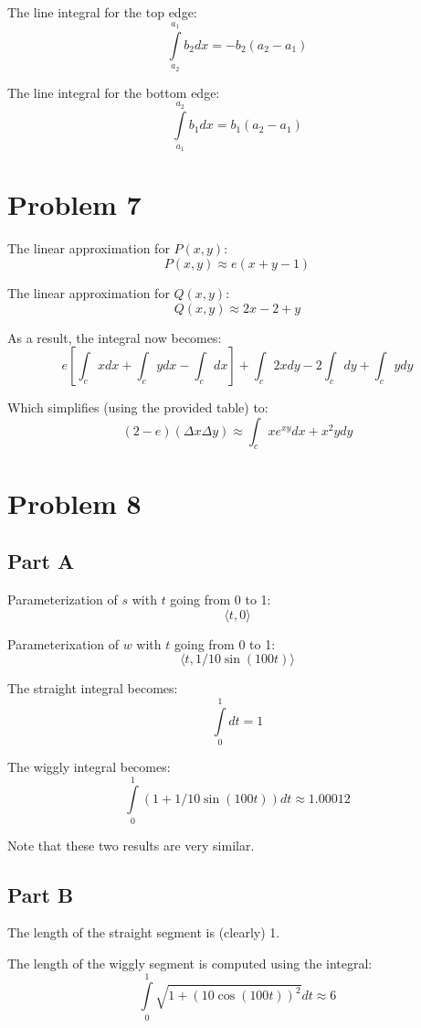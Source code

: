 \documentclass{article}
\begin{document}
The line integral for the top edge:
$$ \int\limits_{a_2}^{a_1} b_2 dx = -b_2(a_2 - a_1) $$

The line integral for the bottom edge:
$$ \int\limits_{a_1}^{a_2} b_1 dx = b_1(a_2 - a_1) $$

\section*{Problem 7}

The linear approximation for $P(x, y)$:
$$ P(x, y) \approx e(x + y - 1) $$

The linear approximation for $Q(x, y)$:
$$ Q(x, y) \approx 2x - 2 + y $$

As a result, the integral now becomes:
$$ e \left[ \int_c x dx + \int_c y dx - \int_c dx \right] + \int_c 2x dy - 2
\int_c dy + \int_c y dy $$

Which simplifies (using the provided table) to:
$$ (2 - e)(\Delta x \Delta y) \approx \int_c x e^{xy} dx + x^2 y dy $$

\section*{Problem 8}

\subsection*{Part A}

Parameterization of $s$ with $t$ going from 0 to 1:
$$ \langle t, 0 \rangle $$

Parameterixation of $w$ with $t$ going from 0 to 1:
$$ \langle t, 1/10 \sin \left( 100 t \right) \rangle $$

The straight integral becomes:
$$ \int\limits_0^1 dt = 1 $$

The wiggly integral becomes:
$$ \int\limits_0^1 (1 + 1/10 \sin \left( 100 t \right) ) dt \approx 1.00012 $$

Note that these two results are very similar.

\subsection*{Part B}

The length of the straight segment is (clearly) 1.

\bigbreak

The length of the wiggly segment is computed using the integral:
$$ \int\limits_0^1 \sqrt{1 + \left( 10 \cos \left( 100 t \right) \right)^2 } dt
\approx 6 $$
\end{document}
